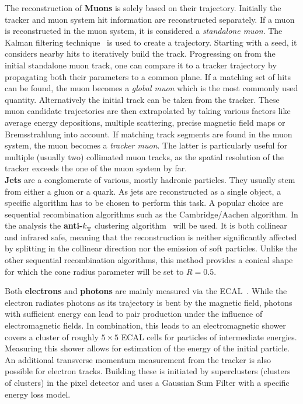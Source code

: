 The reconstruction of \textbf{Muons} is solely based on their trajectory. Initially the tracker and muon system hit information are reconstructed separately. If a muon is reconstructed in the muon system, it is considered a \textit{standalone muon}. The Kalman filtering technique~\cite{kalman} is used to create a trajectory. Starting with a seed, it considers nearby hits to iteratively build the track. Progressing on from the initial standalone muon track, one can compare it to a tracker trajectory by propagating both their parameters to a common plane. If a matching set of hits can be found, the muon becomes a \textit{global muon} which is the most commonly used quantity. Alternatively the initial track can be taken from the tracker. These muon candidate trajectories are then extrapolated by taking various factors like average energy depositions, multiple scattering, precise magnetic field maps or Bremsstrahlung into account. If matching track segments are found in the muon system, the muon becomes a \textit{tracker muon}. The latter is particularly useful for multiple (usually two) collimated muon tracks, as the spatial resolution of the tracker exceeds the one of the muon system by far. \\

\textbf{Jets} are a conglomerate of various, mostly hadronic particles. They usually stem from either a gluon or a quark. As jets are reconstructed as a single object, a specific algorithm has to be chosen to perform this task. A popular choice are sequential recombination algorithms such as the Cambridge/Aachen algorithm. In the analysis the \textbf{anti-$k_\textbf{T}$} clustering algorithm~\cite{antikt} will be used. It is both collinear and infrared safe, meaning that the reconstruction is neither significantly affected by splitting in the collinear direction nor the emission of soft particles. Unlike the other sequential recombination algorithms, this method provides a conical shape for which the cone radius parameter will be set to $R = 0.5$.

Both \textbf{electrons} and \textbf{photons} are mainly measured via the ECAL~\cite{elereco}. While the electron radiates photons as its trajectory is bent by the magnetic field, photons with sufficient energy can lead to pair production under the influence of electromagnetic fields. In combination, this leads to an electromagnetic shower covers a cluster of roughly $5 \times 5$ ECAL cells for particles of intermediate energies. Measuring this shower allows for estimation of the energy of the initial particle. An additional transverse momentum measurement from the tracker is also possible for electron tracks. Building these is initiated by superclusters (clusters of clusters) in the pixel detector and uses a Gaussian Sum Filter with a specific energy loss model.

